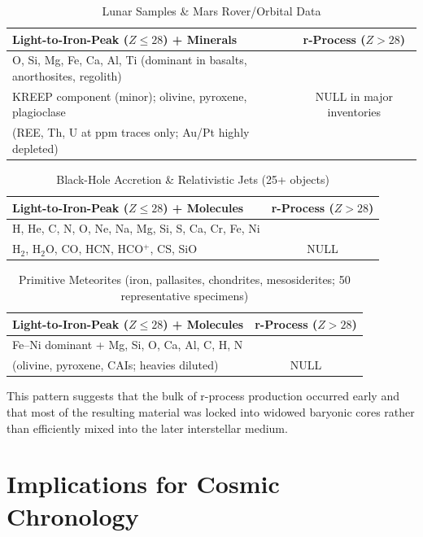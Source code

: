 \documentclass[12pt]{article}
\begin{document}
\begin{table}[htbp]
\centering
\caption{Lunar Samples \& Mars Rover/Orbital Data}
\begin{tabular}{p{8.0cm}c}
\toprule
\textbf{Light-to-Iron-Peak ($Z \leq 28$) + Minerals} & \textbf{r-Process ($Z > 28$)} \\
\midrule
O, Si, Mg, Fe, Ca, Al, Ti (dominant in basalts, anorthosites, regolith) \\
KREEP component (minor); olivine, pyroxene, plagioclase 
& NULL in major inventories \\
(REE, Th, U at ppm traces only; Au/Pt highly depleted) \\
\bottomrule
\end{tabular}
\end{table}

\begin{table}[htbp]
\centering
\caption{Black-Hole Accretion \& Relativistic Jets (25+ objects)}
\begin{tabular}{p{8.0cm}c}
\toprule
\textbf{Light-to-Iron-Peak ($Z \leq 28$) + Molecules} & \textbf{r-Process ($Z > 28$)} \\
\midrule
H, He, C, N, O, Ne, Na, Mg, Si, S, Ca, Cr, Fe, Ni \\
H$_2$, H$_2$O, CO, HCN, HCO$^+$, CS, SiO 
& NULL \\
\bottomrule
\end{tabular}
\end{table}

\begin{table}[htbp]
\centering
\caption{Primitive Meteorites (iron, pallasites, chondrites, mesosiderites; 50 representative specimens)}
\begin{tabular}{p{8.0cm}c}
\toprule
\textbf{Light-to-Iron-Peak ($Z \leq 28$) + Molecules} & \textbf{r-Process ($Z > 28$)} \\
\midrule
Fe--Ni dominant + Mg, Si, O, Ca, Al, C, H, N \\
(olivine, pyroxene, CAIs; heavies diluted)
& NULL \\
\bottomrule
\end{tabular}
\end{table}

This pattern suggests that the bulk of r-process production occurred early and that most of the resulting material was locked into widowed baryonic cores rather than efficiently mixed into the later interstellar medium.

\section{Implications for Cosmic Chronology}
\end{document}
